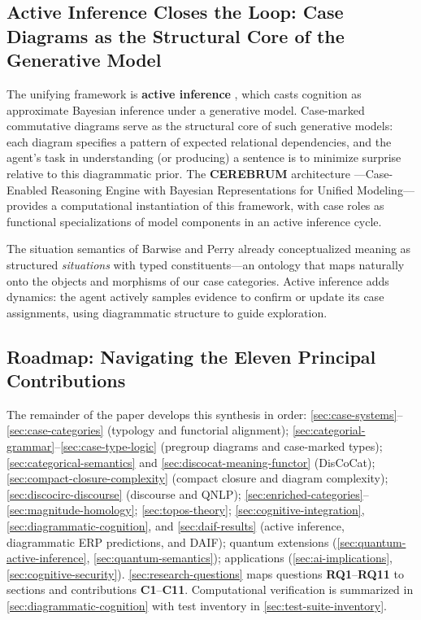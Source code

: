 \documentclass[
]{article}
\begin{document}
\subsection{Active Inference Closes the Loop: Case Diagrams as the
Structural Core of the Generative
Model}\label{active-inference-closes-the-loop-case-diagrams-as-the-structural-core-of-the-generative-model}

The unifying framework is \textbf{active inference}
\citep{namjoshi2026fundamentals}, which casts cognition as approximate
Bayesian inference under a generative model. Case-marked commutative
diagrams serve as the structural core of such generative models: each
diagram specifies a pattern of expected relational dependencies, and the
agent's task in understanding (or producing) a sentence is to minimize
surprise relative to this diagrammatic prior. The \textbf{CEREBRUM}
architecture \citep{friedman2024cerebrum}---Case-Enabled Reasoning
Engine with Bayesian Representations for Unified Modeling---provides a
computational instantiation of this framework, with case roles as
functional specializations of model components in an active inference
cycle.

The situation semantics of Barwise and Perry
\citeyearpar{barwise1983situations} already conceptualized meaning as
structured \emph{situations} with typed constituents---an ontology that
maps naturally onto the objects and morphisms of our case categories.
Active inference adds dynamics: the agent actively samples evidence to
confirm or update its case assignments, using diagrammatic structure to
guide exploration.

\subsection{Roadmap: Navigating the Eleven Principal
Contributions}\label{roadmap-navigating-the-eleven-principal-contributions}

The remainder of the paper develops this synthesis in order:
\autoref{sec:case-systems}--\autoref{sec:case-categories} (typology and
functorial alignment);
\autoref{sec:categorial-grammar}--\autoref{sec:case-type-logic}
(pregroup diagrams and case-marked types);
\autoref{sec:categorical-semantics} and
\autoref{sec:discocat-meaning-functor} (DisCoCat);
\autoref{sec:compact-closure-complexity} (compact closure and diagram
complexity); \autoref{sec:discocirc-discourse} (discourse and QNLP);
\autoref{sec:enriched-categories}--\autoref{sec:magnitude-homology};
\autoref{sec:topos-theory}; \autoref{sec:cognitive-integration},
\autoref{sec:diagrammatic-cognition}, and \autoref{sec:daif-results}
(active inference, diagrammatic ERP predictions, and DAIF); quantum
extensions (\autoref{sec:quantum-active-inference},
\autoref{sec:quantum-semantics}); applications
(\autoref{sec:ai-implications}, \autoref{sec:cognitive-security}).
\autoref{sec:research-questions} maps questions
\textbf{RQ1}--\textbf{RQ11} to sections and contributions
\textbf{C1}--\textbf{C11}. Computational verification is summarized in
\autoref{sec:diagrammatic-cognition} with test inventory in
\autoref{sec:test-suite-inventory}.
\end{document}
